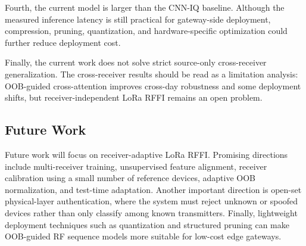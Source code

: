 Fourth, the current model is larger than the CNN-IQ baseline. Although the measured inference latency is still practical for gateway-side deployment, compression, pruning, quantization, and hardware-specific optimization could further reduce deployment cost.

Finally, the current work does not solve strict source-only cross-receiver generalization. The cross-receiver results should be read as a limitation analysis: OOB-guided cross-attention improves cross-day robustness and some deployment shifts, but receiver-independent LoRa RFFI remains an open problem.

\subsection{Future Work}

Future work will focus on receiver-adaptive LoRa RFFI. Promising directions include multi-receiver training, unsupervised feature alignment, receiver calibration using a small number of reference devices, adaptive OOB normalization, and test-time adaptation. Another important direction is open-set physical-layer authentication, where the system must reject unknown or spoofed devices rather than only classify among known transmitters. Finally, lightweight deployment techniques such as quantization and structured pruning can make OOB-guided RF sequence models more suitable for low-cost edge gateways.
